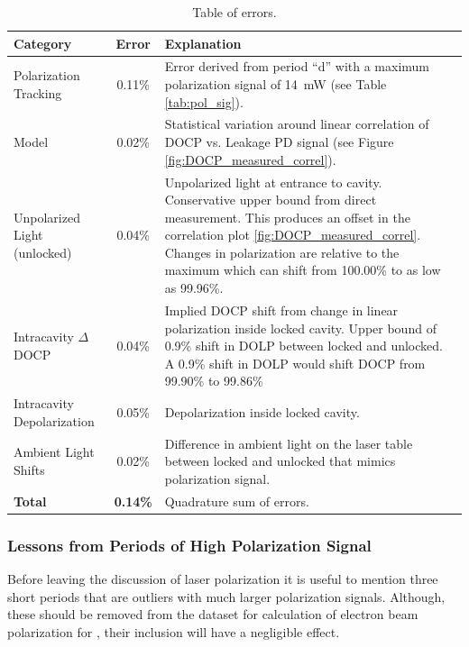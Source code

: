 \begin{table}
\begin{center}
\caption{\label{tab:pol_error}Table of errors.}
\begin{tabular}{|l|c|p{7cm}|}\hline
Category&Error&Explanation\\\hline
Polarization Tracking&0.11\%&Error derived from period ``d'' with a maximum polarization signal of 14~mW (see Table \ref{tab:pol_sig}).\\
Model&0.02\%&Statistical variation around linear correlation of DOCP vs. Leakage PD signal (see Figure \ref{fig:DOCP_measured_correl}).\\
Unpolarized Light (unlocked)&0.04\%&Unpolarized light at entrance to cavity. Conservative upper bound from direct measurement. This produces an offset in the correlation plot \ref{fig:DOCP_measured_correl}. Changes in polarization are relative to the maximum which can shift from 100.00\% to as low as 99.96\%.\\
Intracavity $\Delta$DOCP&0.04\%&Implied DOCP shift from change in linear polarization inside locked cavity. Upper bound of 0.9\% shift in DOLP between locked and unlocked. A 0.9\% shift in DOLP would shift DOCP from 99.90\% to 99.86\%\\
Intracavity Depolarization&0.05\%&Depolarization inside locked cavity.\\
Ambient Light Shifts&0.02\%&Difference in ambient light on the laser table between locked and unlocked that mimics polarization signal.\\\hline
{\bf Total}&{\bf 0.14\%}&Quadrature sum of errors.\\\hline

\end{tabular}


\end{center}
\end{table}

\subsubsection{Lessons from Periods of High Polarization Signal}
Before leaving the discussion of laser polarization it is useful to mention three short periods that are outliers with much larger polarization signals. Although, these should be removed from the dataset for calculation of electron beam polarization for \Q, their inclusion will have a negligible effect. 

